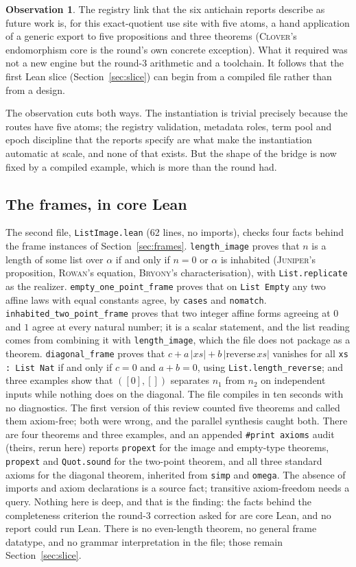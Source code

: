 \documentclass[11pt,a4paper]{article}
\newcommand{\code}[1]{\nolinkurl{#1}}
\newcommand{\Br}{\textsc{Bryony}}
\newcommand{\Cl}{\textsc{Clover}}
\newcommand{\Ju}{\textsc{Juniper}}
\newcommand{\Ro}{\textsc{Rowan}}
\theoremstyle{definition}
\newtheorem{observation}{Observation}[section]
\theoremstyle{plain}
\begin{document}
\begin{observation}\label{obs:routes}
The registry link that the six antichain reports describe as future work is, for this exact-quotient use site with five atoms, a hand application of a generic export to five propositions and three theorems (\Cl's endomorphism core is the round's own concrete exception). What it required was not a new engine but the round-3 arithmetic and a toolchain. It follows that the first Lean slice (Section~\ref{sec:slice}) can begin from a compiled file rather than from a design.
\end{observation}

The observation cuts both ways. The instantiation is trivial precisely because the routes have five atoms; the registry validation, metadata roles, term pool and epoch discipline that the reports specify are what make the instantiation automatic at scale, and none of that exists. But the shape of the bridge is now fixed by a compiled example, which is more than the round had.

\subsection{The frames, in core Lean}\label{sec:frames-lean}
The second file, \code{ListImage.lean} (62 lines, no imports), checks four facts behind the frame instances of Section~\ref{sec:frames}. \code{length_image} proves that $n$ is a length of some list over $\alpha$ if and only if $n=0$ or $\alpha$ is inhabited (\Ju's proposition, \Ro's equation, \Br's characterisation), with \code{List.replicate} as the realizer. \code{empty_one_point_frame} proves that on \code{List Empty} any two affine laws with equal constants agree, by \code{cases} and \code{nomatch}. \code{inhabited_two_point_frame} proves that two integer affine forms agreeing at $0$ and $1$ agree at every natural number; it is a scalar statement, and the list reading comes from combining it with \code{length_image}, which the file does not package as a theorem. \code{diagonal_frame} proves that $c+a\,|xs|+b\,|\mathrm{reverse}\,xs|$ vanishes for all \code{xs : List Nat} if and only if $c=0$ and $a+b=0$, using \code{List.length_reverse}; and three examples show that $([0],[])$ separates $n_1$ from $n_2$ on independent inputs while nothing does on the diagonal. The file compiles in ten seconds with no diagnostics. The first version of this review counted five theorems and called them axiom-free; both were wrong, and the parallel synthesis caught both. There are four theorems and three examples, and an appended \texttt{\#print axioms} audit (theirs, rerun here) reports \code{propext} for the image and empty-type theorems, \code{propext} and \code{Quot.sound} for the two-point theorem, and all three standard axioms for the diagonal theorem, inherited from \code{simp} and \code{omega}. The absence of imports and axiom declarations is a source fact; transitive axiom-freedom needs a query. Nothing here is deep, and that is the finding: the facts behind the completeness criterion the round-3 correction asked for are core Lean, and no report could run Lean. There is no even-length theorem, no general frame datatype, and no grammar interpretation in the file; those remain Section~\ref{sec:slice}.
\end{document}
